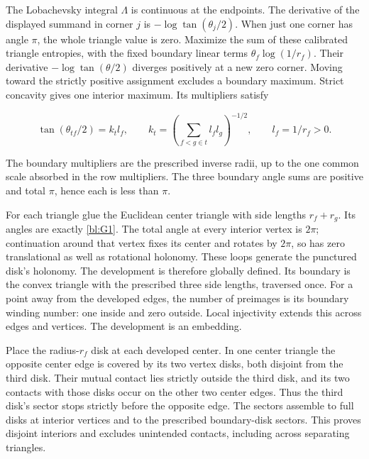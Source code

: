 The Lobachevsky integral $\Lambda$ is continuous at the endpoints.
The derivative of the displayed summand in corner $j$ is
$-\log\tan(\theta_j/2)$. When just one corner has angle $\pi$,
the whole triangle value is zero. Maximize the sum of these calibrated triangle entropies, with the fixed
boundary linear terms \(\theta_f\log(1/r_f)\). Their derivative
\(-\log\tan(\theta/2)\) diverges positively at a new zero corner.
Moving toward the strictly positive assignment excludes a boundary
maximum. Strict concavity gives one interior maximum. Its multipliers
satisfy

\begin{equation}\label{bl:G1}
\tan(\theta_{tf}/2)=k_t l_f,\qquad
k_t=\left(\sum_{f<g\in t}l_fl_g\right)^{-1/2},
\qquad l_f=1/r_f>0.
\end{equation}

The boundary multipliers are the prescribed inverse radii, up to the
one common scale absorbed in the row multipliers. The three boundary
angle sums are positive and total \(\pi\), hence each is less than
\(\pi\).

For each triangle glue the Euclidean center triangle with side lengths
\(r_f+r_g\). Its angles are exactly \eqref{bl:G1}. The total angle at every
interior vertex is \(2\pi\); continuation around that vertex fixes
its center and rotates by \(2\pi\), so has zero translational as
well as rotational holonomy. These loops generate the punctured
disk's holonomy. The development is therefore globally defined. Its
boundary is the convex triangle with the prescribed three side lengths,
traversed once. For a point away from the developed edges, the number
of preimages is its boundary winding number: one inside and zero
outside. Local injectivity extends this across edges and vertices.
The development is an embedding.

Place the radius-\(r_f\) disk at each developed center. In one center
triangle the opposite center edge is covered by its two vertex disks,
both disjoint from the third disk. Their mutual contact lies strictly
outside the third disk, and its two contacts with those disks occur
on the other two center edges. Thus the third disk's sector stops
strictly before the opposite edge. The sectors assemble to full disks
at interior vertices and to the prescribed boundary-disk sectors.
This proves disjoint interiors and excludes unintended contacts,
including across separating triangles.

